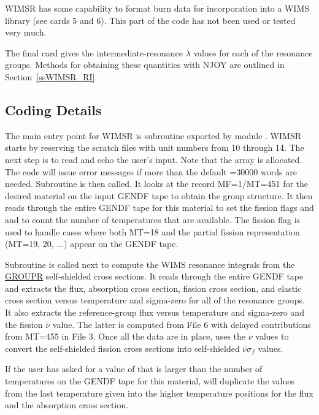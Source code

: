 WIMSR has some capability to format burn data for incorporation
into a WIMS library (see cards 5 and 6).  This part of the code
has not been used or tested very much.

The final card gives the intermediate-resonance $\lambda$
values for each of the resonance groups.  Methods for obtaining
these quantities with NJOY are outlined in Section~\ref{ssWIMSR_RI}.


\subsection{Coding Details}
\label{ssWIMSR_coding}

The main entry point for WIMSR is subroutine 
exported by module .
WIMSR starts by reserving the scratch files with unit numbers
from 10 through 14.  The next step is to read and echo the user's input.
Note that the array  is allocated.  The code will issue
error messages if more than the default =30000 words
are needed.  Subroutine  is then called.  It looks at
the record MF=1/MT=451 for the desired material on the input GENDF tape
to obtain the group structure.  It then reads through the entire GENDF
tape for this material to set the fission flags  and
 and to count the number of temperatures that are
available.  The fission flag is used to handle cases where
both MT=18 and the partial fission representation (MT=19, 20, ...)
appear on the GENDF tape.

Subroutine  is called next to compute the WIMS
resonance integrals from the
\hyperlink{sGROUPRhy}{GROUPR} self-shielded cross sections.
It reads through the entire GENDF tape and extracts the flux,
absorption cross section, fission cross section, and elastic
cross section versus temperature and sigma-zero for all of the
resonance groups.  It also extracts the reference-group flux
versus temperature and sigma-zero and the fission $\overline{\nu}$
value.  The latter is computed from File 6 with delayed contributions
from MT=455 in File 3.  Once all the data are in place,
 uses the $\overline{\nu}$ values to convert
the self-shielded fission cross sections into self-shielded
$\overline{\nu}\sigma_f$ values.

If the user has asked for a value of  that is larger
than the number of temperatures on the GENDF tape for this material,
 will duplicate the values from the last temperature
given into the higher temperature positions for the flux and
the absorption cross section.

